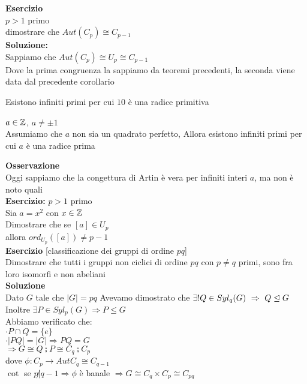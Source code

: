 \documentclass[12px]{article}
\begin{document}
\textbf{Esercizio}\\
$p> 1$ primo\\
dimostrare che  $Aut(C_p)\cong C_{p-1}$\\
\textbf{Soluzione:}\\
Sappiamo che $Aut(C_p)\cong U_p\cong C_{p-1}$\\
Dove la prima congruenza la sappiamo da teoremi precedenti, la seconda viene data dal precedente corollario\\
\begin{congettura}[Gauss, 1801]
	Esistono infiniti primi per cui $10$ è una radice primitiva
\end{congettura}
\begin{congettura}[E. Artin, 1927]
	$a\in\mathbb{Z}$,  $a\neq \pm 1$\\
	Assumiamo che  $a$ non sia un quadrato perfetto, Allora esistono infiniti primi per cui $a $ è una radice prima
\end{congettura}
\textbf{Osservazione}\\
Oggi sappiamo che la congettura di Artin è vera per infiniti interi $a$, ma non è noto quali\\
\textbf{Esercizio:}
$p > 1$ primo\\
Sia  $a = x^2$ con  $x\in\mathbb{Z}$\\
Dimostrare che se  $[a]\in U_p$\\
allora  $ord_{U_p}([a])\neq p- 1$\\
\textbf{Esercizio} [classificazione dei gruppi di ordine $pq$]\\
Dimostrare che tutti i gruppi non ciclici di ordine $pq$ con  $p\neq q$ primi, sono fra loro isomorfi e non abeliani\\
\textbf{Soluzione}\\
Dato $G$ tale che $|G| = pq$
Avevamo dimostrato che $\exists ! Q\in Syl_q(G) \ \Rightarrow \ Q\trianglelefteq G$\\
Inoltre $\exists P\in Syl_p(G) \Rightarrow P\leq G$  \\
Abbiamo verificato che:\\
$\cdot P\cap Q = \{e\}$\\
 $\cdot |PQ| = |G| \Rightarrow PQ = G$ \\
 $ \Rightarrow G\cong Q\semi P \cong C_q\semi C_p$\\
 dove $\phi : C_p \rightarrow Aut C_q\cong C_{q-1}$\\
 $\cot$ se $p\not | q-1 \Rightarrow \phi$ è banale $ \Rightarrow G\cong C_q\times C_p\cong C_{pq}$\\
\end{document}
